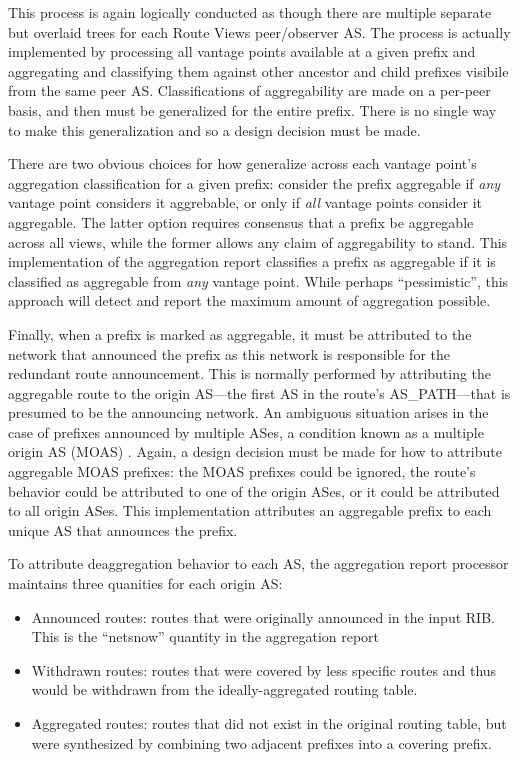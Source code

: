 This process is again logically conducted as though there are multiple separate but overlaid trees for each Route Views peer/observer AS. The process is actually implemented by processing all vantage points available at a given prefix and aggregating and classifying them against other ancestor and child prefixes visibile from the same peer AS. Classifications of aggregability are made on a per-peer basis, and then must be generalized for the entire prefix. There is no single way to make this generalization and so a design decision must be made.

There are two obvious choices for how generalize across each vantage point's aggregation classification for a given prefix: consider the prefix aggregable if \emph{any} vantage point considers it aggrebable, or only if \emph{all} vantage points consider it aggregable. The latter option requires consensus that a prefix be aggregable across all views, while the former allows any claim of aggregability to stand. This implementation of the aggregation report classifies a prefix as aggregable if it is classified as aggregable from \emph{any} vantage point. While perhaps ``pessimistic'', this approach will detect and report the maximum amount of aggregation possible.

Finally, when a prefix is marked as aggregable, it must be attributed to the network that announced the prefix as this network is responsible for the redundant route announcement. This is normally performed by attributing the aggregable route to the origin AS---the first AS in the route's AS\_PATH---that is presumed to be the announcing network. An ambiguous situation arises in the case of prefixes announced by multiple ASes, a condition known as a multiple origin AS (MOAS) \cite{moas-10.1145/505202.505207}. Again, a design decision must be made for how to attribute aggregable MOAS prefixes: the MOAS prefixes could be ignored, the route's behavior could be attributed to one of the origin ASes, or it could be attributed to all origin ASes. This implementation attributes an aggregable prefix to each unique AS that announces the prefix.

To attribute deaggregation behavior to each AS, the aggregation report processor maintains three quanities for each origin AS:

\begin{itemize}
\item{Announced routes: routes that were originally announced in the input RIB. This is the ``netsnow'' quantity in the aggregation report}
\item{Withdrawn routes: routes that were covered by less specific routes and thus would be withdrawn from the ideally-aggregated routing table.}
\item{Aggregated routes: routes that did not exist in the original routing table, but were synthesized by combining two adjacent prefixes into a covering prefix.}
\end{itemize}


